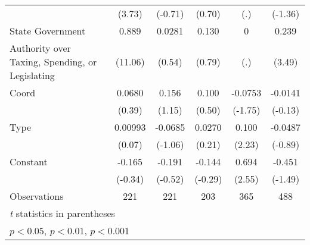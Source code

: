 {\begin{tabular}{l*{5}{c}}
                    &      (3.73)         &     (-0.71)         &      (0.70)         &         (.)         &     (-1.36)         \\
[1em]
State Government    &       0.889\sym{***}&      0.0281         &       0.130         &           0         &       0.239\sym{**} \\
Authority over Taxing, Spending, or Legislating&     (11.06)         &      (0.54)         &      (0.79)         &         (.)         &      (3.49)         \\
[1em]
Coord               &      0.0680         &       0.156         &       0.100         &     -0.0753         &     -0.0141         \\
                    &      (0.39)         &      (1.15)         &      (0.50)         &     (-1.75)         &     (-0.13)         \\
[1em]
Type                &     0.00993         &     -0.0685         &      0.0270         &       0.100\sym{*}  &     -0.0487         \\
                    &      (0.07)         &     (-1.06)         &      (0.21)         &      (2.23)         &     (-0.89)         \\
[1em]
Constant            &      -0.165         &      -0.191         &      -0.144         &       0.694\sym{*}  &      -0.451         \\
                    &     (-0.34)         &     (-0.52)         &     (-0.29)         &      (2.55)         &     (-1.49)         \\
\hline
Observations        &         221         &         221         &         203         &         365         &         488         \\
\hline\hline
\multicolumn{6}{l}{\footnotesize \textit{t} statistics in parentheses}\\
\multicolumn{6}{l}{\footnotesize \sym{*} \(p<0.05\), \sym{**} \(p<0.01\), \sym{***} \(p<0.001\)}\\
\end{tabular}
}
